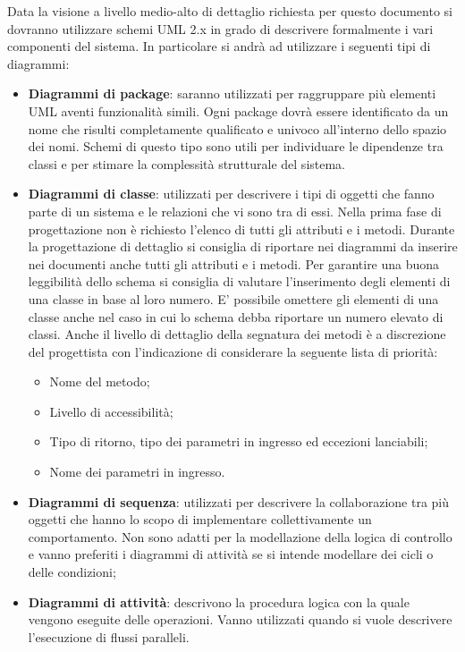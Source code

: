 		Data la visione a livello medio-alto di dettaglio richiesta per questo documento si dovranno utilizzare schemi UML 2.x in grado di descrivere formalmente i vari componenti	del sistema.
		In particolare si andrà ad utilizzare i seguenti tipi di diagrammi:
		\begin{itemize}
		
		
		\item \textbf{Diagrammi di package}: saranno utilizzati per raggruppare più elementi UML aventi funzionalità simili. Ogni package dovrà essere identificato da un	nome che risulti completamente qualificato e univoco all’interno dello spazio
		dei nomi. Schemi di questo tipo sono utili per individuare le dipendenze tra classi e per stimare la complessità strutturale del sistema.
		\item \textbf{Diagrammi di classe}: utilizzati per descrivere i tipi di oggetti che fanno parte di un sistema e le relazioni che vi sono tra di essi. Nella prima fase di progettazione non è richiesto l'elenco di tutti gli attributi e i metodi. Durante
		la progettazione di dettaglio si consiglia di riportare nei diagrammi da inserire nei documenti anche tutti gli attributi e i metodi. Per garantire una buona	leggibilità dello schema si consiglia di valutare l'inserimento degli elementi di una classe in base al loro numero. E' possibile omettere gli elementi di una classe anche nel caso in cui lo schema debba riportare un numero elevato di classi. Anche il livello di dettaglio della segnatura dei metodi è a discrezione	del progettista con l’indicazione di considerare la seguente lista di priorità:
		\begin{itemize}		
		\item Nome del metodo;
		\item Livello di accessibilità;
		\item Tipo di ritorno, tipo dei parametri in ingresso ed eccezioni lanciabili;
		\item Nome dei parametri in ingresso.
		\end{itemize}
		\item \textbf{Diagrammi di sequenza}: utilizzati per descrivere la collaborazione tra più oggetti che hanno lo scopo di implementare collettivamente un comportamento. Non sono adatti per la modellazione della logica di controllo e vanno preferiti i diagrammi di attività se si intende modellare dei cicli o delle condizioni;
		\item \textbf{Diagrammi di attività}: descrivono la procedura logica con la quale vengono eseguite delle operazioni. Vanno utilizzati quando si vuole descrivere	l’esecuzione di flussi paralleli.
        \end{itemize}
